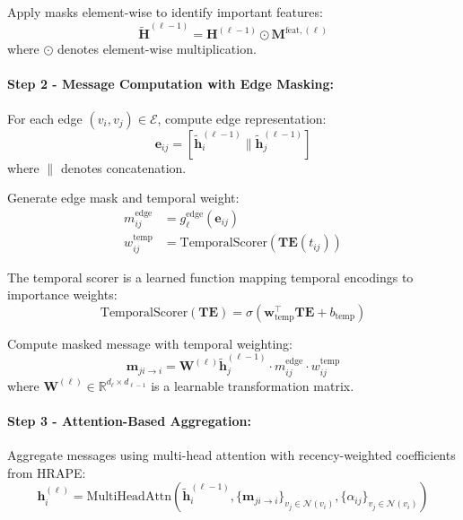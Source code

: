 Apply masks element-wise to identify important features:
\begin{equation}
    \tilde{\mathbf{H}}^{(\ell-1)} = \mathbf{H}^{(\ell-1)} \odot \mathbf{M}^{\text{feat},(\ell)}
\end{equation}
where $\odot$ denotes element-wise multiplication.

\paragraph{Step 2 - Message Computation with Edge Masking:} For each edge $(v_i, v_j) \in \mathcal{E}$, compute edge representation:
\begin{equation}
    \mathbf{e}_{ij} = \left[\tilde{\mathbf{h}}^{(\ell-1)}_i \| \tilde{\mathbf{h}}^{(\ell-1)}_j\right]
\end{equation}
where $\|$ denotes concatenation.

Generate edge mask and temporal weight:
\begin{align}
    m_{ij}^{\text{edge}} &= g^{\text{edge}}_\ell(\mathbf{e}_{ij}) \\
    w_{ij}^{\text{temp}} &= \text{TemporalScorer}(\mathbf{TE}(t_{ij}))
\end{align}

The temporal scorer is a learned function mapping temporal encodings to importance weights:
\begin{equation}
    \text{TemporalScorer}(\mathbf{TE}) = \sigma(\mathbf{w}_{\text{temp}}^\top \mathbf{TE} + b_{\text{temp}})
\end{equation}

Compute masked message with temporal weighting:
\begin{equation}
    \mathbf{m}_{ji \to i} = \mathbf{W}^{(\ell)} \tilde{\mathbf{h}}^{(\ell-1)}_j \cdot m_{ij}^{\text{edge}} \cdot w_{ij}^{\text{temp}}
\end{equation}
where $\mathbf{W}^{(\ell)} \in \mathbb{R}^{d_\ell \times d_{\ell-1}}$ is a learnable transformation matrix.

\paragraph{Step 3 - Attention-Based Aggregation:} Aggregate messages using multi-head attention with recency-weighted coefficients from HRAPE:
\begin{equation}
    \mathbf{h}_i^{(\ell)} = \text{MultiHeadAttn}\left(\tilde{\mathbf{h}}^{(\ell-1)}_i, \{\mathbf{m}_{ji \to i}\}_{v_j \in \mathcal{N}(v_i)}, \{\alpha_{ij}\}_{v_j \in \mathcal{N}(v_i)}\right)
\end{equation}

